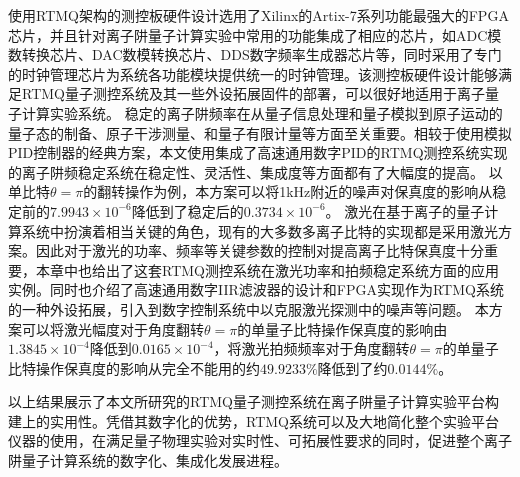 使用RTMQ架构的测控板硬件设计选用了Xilinx的Artix-7系列功能最强大的FPGA芯片，并且针对离子阱量子计算实验中常用的功能集成了相应的芯片，如ADC模数转换芯片、DAC数模转换芯片、DDS数字频率生成器芯片等，同时采用了专门的时钟管理芯片为系统各功能模块提供统一的时钟管理。该测控板硬件设计能够满足RTMQ量子测控系统及其一些外设拓展固件的部署，可以很好地适用于离子量子计算实验系统。
稳定的离子阱频率在从量子信息处理和量子模拟到原子运动的量子态的制备、原子干涉测量、和量子有限计量等方面至关重要。相较于使用模拟PID控制器的经典方案，本文使用集成了高速通用数字PID的RTMQ测控系统实现的离子阱频稳定系统在稳定性、灵活性、集成度等方面都有了大幅度的提高。
以单比特$\theta=\pi$的翻转操作为例，本方案可以将1kHz附近的噪声对保真度的影响从稳定前的$7.9943\times10^{-6}$降低到了稳定后的$0.3734\times10^{-6}$。
激光在基于离子的量子计算系统中扮演着相当关键的角色，现有的大多数多离子比特的实现都是采用激光方案。因此对于激光的功率、频率等关键参数的控制对提高离子比特保真度十分重要，本章中也给出了这套RTMQ测控系统在激光功率和拍频稳定系统方面的应用实例。同时也介绍了高速通用数字IIR滤波器的设计和FPGA实现作为RTMQ系统的一种外设拓展，引入到数字控制系统中以克服激光探测中的噪声等问题。
本方案可以将激光幅度对于角度翻转$\theta=\pi$的单量子比特操作保真度的影响由$1.3845\times 10^{-4}$降低到$0.0165\times 10^{-4}$，将激光拍频频率对于角度翻转$\theta=\pi$的单量子比特操作保真度的影响从完全不能用的约$49.9233\%$降低到了约$0.0144\%$。

以上结果展示了本文所研究的RTMQ量子测控系统在离子阱量子计算实验平台构建上的实用性。凭借其数字化的优势，RTMQ系统可以及大地简化整个实验平台仪器的使用，在满足量子物理实验对实时性、可拓展性要求的同时，促进整个离子阱量子计算系统的数字化、集成化发展进程。





